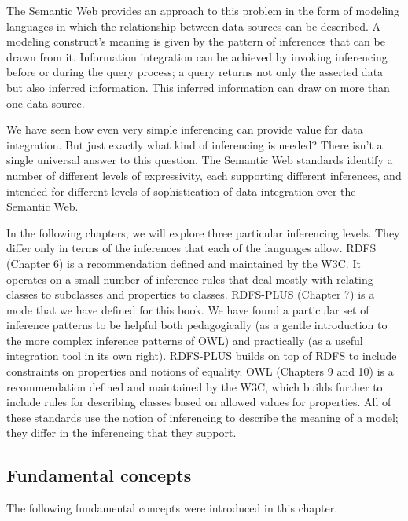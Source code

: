 The Semantic Web provides an approach to this problem in the form of
modeling languages in which the relationship between data sources can be
described. A modeling construct's meaning is given by the pattern of
inferences that can be drawn from it. Information integration can be
achieved by invoking inferencing before or during the query process; a
query returns not only the asserted data but also inferred information.
This inferred information can draw on more than one data source.

We have seen how even very simple inferencing can provide value for data
integration. But just exactly what kind of inferencing is needed? There
isn't a single universal answer to this question. The
Semantic Web standards identify a number of different levels of
expressivity, each supporting different inferences, and intended for
different levels of sophistication of data integration over the Semantic
Web.

In the following chapters, we will explore three particular inferencing
levels. They differ only in terms of the inferences that each of the
languages allow. RDFS (Chapter 6) is a recommendation defined and
maintained by the W3C. It operates on a small number of inference rules
that deal mostly with relating classes to subclasses and properties to
classes. RDFS-PLUS (Chapter 7) is a mode that we have defined for this
book. We have found a particular set of inference patterns to be helpful
both pedagogically (as a gentle introduction to the more complex
inference patterns of OWL) and practically (as a useful integration tool
in its own right). RDFS-PLUS builds on top of RDFS to include
constraints on properties and notions of equality. OWL (Chapters 9 and
10) is a recommendation defined and maintained by the W3C, which builds
further to include rules for describing classes based on allowed values
for properties. All of these standards use the notion of inferencing to
describe the meaning of a model; they differ in the inferencing that
they support.

\subsection{Fundamental concepts}

The following fundamental concepts were introduced in this chapter.

